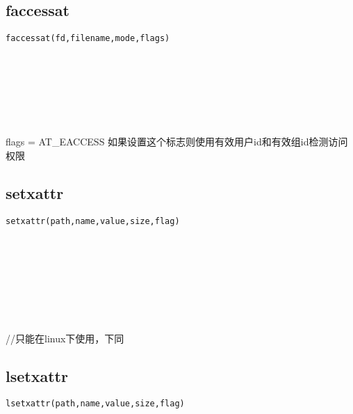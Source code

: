 \documentclass[10pt,a4paper]{article}
\begin{document}
\subsection{faccessat}
\begin{spacing}{2.0}
\lstset{language=C,numbers=none}
\begin{lstlisting}
faccessat(fd,filename,mode,flags)
\end{lstlisting}
{\large\color[rgb]{0.2,0.4,0.6}{fd:}} \\
{\large\color[rgb]{0.2,0.4,0.6}{filename:}} \\
{\large\color[rgb]{0.2,0.4,0.6}{mode:}} \\
{\large\color[rgb]{0.2,0.4,0.6}{flags:}}
\paragraph{ \ \ }flags = AT\_EACCESS 如果设置这个标志则使用有效用户id和有效组id检测访问权限
\end{spacing}

\subsection{setxattr}
\begin{spacing}{2.0}
\lstset{language=C,numbers=none}
\begin{lstlisting}
setxattr(path,name,value,size,flag)
\end{lstlisting}
{\large\color[rgb]{0.2,0.4,0.6}{path:}} \\
{\large\color[rgb]{0.2,0.4,0.6}{name:}} \\
{\large\color[rgb]{0.2,0.4,0.6}{value:}} \\
{\large\color[rgb]{0.2,0.4,0.6}{size:}} \\
{\large\color[rgb]{0.2,0.4,0.6}{flag:}}
\paragraph{ \ \ }//只能在linux下使用，下同
\end{spacing}

\subsection{lsetxattr}
\begin{spacing}{2.0}
\lstset{language=C,numbers=none}
\begin{lstlisting}
lsetxattr(path,name,value,size,flag)
\end{lstlisting}
{\large\color[rgb]{0.2,0.4,0.6}{path:}} \\
{\large\color[rgb]{0.2,0.4,0.6}{name:}} \\
{\large\color[rgb]{0.2,0.4,0.6}{value:}} \\
{\large\color[rgb]{0.2,0.4,0.6}{size:}} \\
{\large\color[rgb]{0.2,0.4,0.6}{flag:}}
\paragraph{ \ \ }
\end{spacing}
\end{document}
